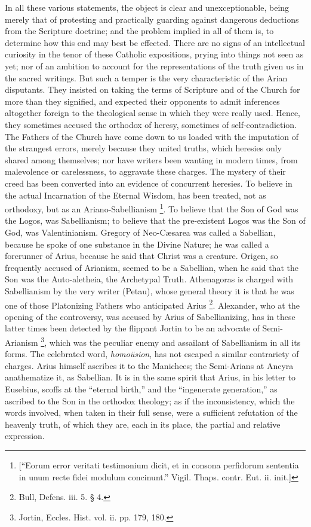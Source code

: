 In all these various statements, the object is clear and
unexceptionable, being merely that of protesting and practically
guarding against dangerous deductions from the Scripture doctrine; and
the problem implied in all of them is, to determine how this end may
best be effected. There are no signs of an intellectual curiosity in
the tenor of these Catholic expositions, prying into things not seen
as yet; nor of an ambition to account for the representations of the
truth given us in the sacred writings. But such a temper is the very
characteristic of the Arian disputants. They insisted on taking the
terms of Scripture and of the Church for more than they signified, and
expected their opponents to admit inferences altogether foreign to the
theological sense in which they were really used. Hence, they
sometimes accused the orthodox of heresy, sometimes of
self-contradiction. The Fathers of the Church have come down to us
loaded with the imputation of the strangest errors, merely because
they united truths, which heresies only shared among themselves;
nor have writers been wanting in modern times, from malevolence or
carelessness, to aggravate these charges. The mystery of their creed
has been converted into an evidence of concurrent heresies. To believe
in the actual Incarnation of the Eternal Wisdom, has been treated, not
as orthodoxy, but as an Ariano-Sabellianism \footnote{[``Eorum error veritati testimonium
dicit, et in consona perfidorum sententia in unum recte fidei modulum
concinunt.'' Vigil. Thaps. contr. Eut. ii. init.]}. To believe that the Son of God was the Logos, was
Sabellianism; to believe that the pre-existent Logos was the Son of
God, was Valentinianism. Gregory of Neo-Cæsarea was called a
Sabellian, because he spoke of one substance in the Divine Nature; he
was called a forerunner of Arius, because he said that Christ was a
creature. Origen, so frequently accused of Arianism, seemed to be a
Sabellian, when he said that the Son was the Auto-aletheia, the
Archetypal Truth. Athenagoras is charged with Sabellianism by the very
writer (Petau), whose general theory it is that he was one of those
Platonizing Fathers who anticipated Arius \footnote{Bull, Defens. iii. 5. § 4.}. Alexander, who at the opening of the controversy, was accused
by Arius of Sabellianizing, has in these latter times been detected by
the flippant Jortin to be an advocate of Semi-Arianism \footnote{Jortin, Eccles. Hist. vol. ii. pp. 179,
180.}, which was the peculiar enemy and assailant of Sabellianism in
all its forms. The celebrated word, \emph{homoüsion}, has not escaped
a similar contrariety of charges. Arius himself ascribes it to the
Manichees; the Semi-Arians at Ancyra anathematize it, as Sabellian. It
is in the same spirit that Arius, in his letter to Eusebius,
scoffs at the ``eternal birth,'' and the ``ingenerate
generation,'' as ascribed to the Son in the orthodox theology; as
if the inconsistency, which the words involved, when taken in their
full sense, were a sufficient refutation of the heavenly truth, of
which they are, each in its place, the partial and relative
expression.

